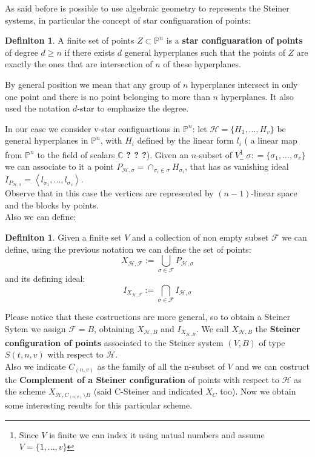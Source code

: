 \documentclass[]{book}
\theoremstyle{plain}
\theoremstyle{remark}
\theoremstyle{definition}
\newtheorem{deff}[teo]{Definiton}
\newcommand{\C}{\mathbb{C}}
\newcommand{\PP}{\mathbb{P}}
\newcommand{\HH}{\mathcal{H}}
\begin{document}
As said before is possible to use algebraic geometry to represents the Steiner systems, in particular the concept of star configuaration of points:

\begin{deff} \label{def:starconf}
A finite set of points $ Z \subset \PP^n $ is a \textbf{star configuaration of points} of degree $ d \geq n $ if there exists $ d $ general hyperplanes such that the points of $ Z $ are exactly the ones that are intersection of $ n $ of these hyperplanes.
\end{deff}
By general position we mean that any group of $ n $ hyperplanes intersect in only one point and there is no point belonging to more than $ n $ hyperplanes. It also used the notation $ d $-star to emphasize the degree. 

In our case we consider v-star configuartions in $ \PP^n $: let $ \HH  = \{ H_1 , ... , H_v\}$ be general hyperplanes in $ \PP^n $, with $ H_i $ defined by the linear form $ l_i $ ( a linear map from $ \PP^n $ to the field of scalars $ \C $ \textbf{? ? ?}). Given an $ n $-subset of $ V $\footnote{Since $ V $ is finite we can index it using natual numbers and assume $ V = \{ 1 , ... , v\} $} $ \sigma : = \{ \sigma_1 , ... , \sigma_v\}$ we can associate to it a point $ P_{\HH, \sigma }= \cap_{\sigma_i \in \sigma} H_{\sigma_i}$, that has as vanishing ideal $ I_{P_{\HH, \sigma}} = \left< l_{\sigma_1} , ... , l_{\sigma_v} \right\rangle $.\\
 Observe that in this case the vertices are represented by $( n-1 )$-linear space and the blocks by points.\\
 Also we can define:
 \begin{deff}\label{def:gensys}
 Given a finite set $ V $ and a collection of non empty subset $ \mathcal{F} $ we can define, using the previous notation we can define the set of points:
 \begin{equation}\label{eq:X}
 X_{\HH , \mathcal{F}}:= \bigcup_{\sigma \in \mathcal{F} } P_{\HH, \sigma }
 \end{equation}
 and its defining ideal:
 \begin{equation}\label{eq:I}
 I_{X_{\HH , \mathcal{F}}}:= \bigcap_{\sigma \in \mathcal{F} } I_{\HH, \sigma }
 \end{equation}
 \end{deff}
 Please notice that these costructions are more general, so to obtain a Steiner Sytem we assign $ \mathcal{F}=B $, obtaining $ X_{\HH , B} $ and $  I_{X_{\HH , B}} $. 
 We call  $ X_{\HH , B} $ the \textbf{Steiner configuration of points} associated to the Steiner system $ (V , B) $ of type $ S(t , n,v) $ with respect to $ \HH $. \\
 Also we indicate $ C_{(n,v)} $ as the family of all the n-subset of $ V $ and we can costruct the \textbf{Complement of a Steiner configuration} of points with respect to $ \HH $ as the scheme $ X_{\HH , C_{(n,v)} \setminus B} $ (said C-Steiner and indicated $ X_C $ too).
Now we obtain some interesting results for this particular scheme. 
 
\end{document}
